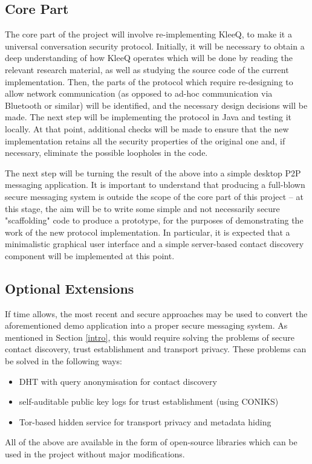 \documentclass[a4paper, 12pt]{report}
\begin{document}
\begin{appendices}
\subsection{Core Part}
The core part of the project will involve re-implementing KleeQ, to make it a universal conversation security protocol. Initially, it will be necessary to obtain a deep understanding of how KleeQ operates which will be done by reading the relevant research material, as well as studying the source code of the current implementation. Then, the parts of the protocol which require re-designing to allow network communication (as opposed to ad-hoc communication via Bluetooth or similar) will be identified, and the necessary design decisions will be made. The next step will be implementing the protocol in Java and testing it locally. At that point, additional checks will be made to ensure that the new implementation retains all the security properties of the original one and, if necessary, eliminate the possible loopholes in the code.

\vspace{\baselineskip}
\noindent
The next step will be turning the result of the above into a simple desktop P2P messaging application. It is important to understand that producing a full-blown secure messaging system is outside the scope of the core part of this project -- at this stage, the aim will be to write some simple and not necessarily secure "scaffolding" code to produce a prototype, for the purposes of demonstrating the work of the new protocol implementation. In particular, it is expected that a minimalistic graphical user interface and a simple server-based contact discovery component will be implemented at this point.


\subsection{Optional Extensions}
If time allows, the most recent and secure approaches may be used to convert the aforementioned demo application into a proper secure messaging system. As mentioned in Section \ref{intro}, this would require solving the problems of secure contact discovery, trust establishment and transport privacy. These problems can be solved in the following ways:
\begin{itemize}
    \item DHT with query anonymisation for contact discovery
    \item self-auditable public key logs for trust establishment (using CONIKS)
    \item Tor-based hidden service for transport privacy and metadata hiding
\end{itemize}
All of the above are available in the form of open-source libraries which can be used in the project without major modifications.


\end{appendices}
\end{document}
